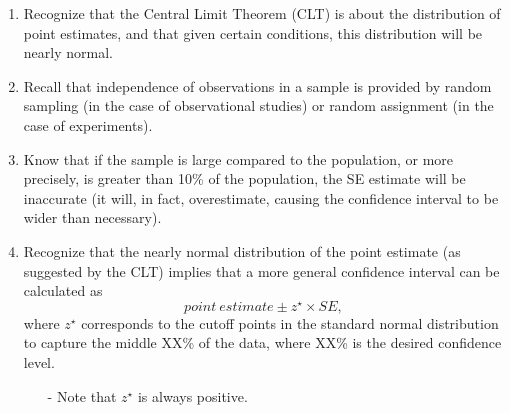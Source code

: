 \documentclass[11pt]{article}
\begin{document}
\begin{enumerate}[resume]
\item Recognize that the Central Limit Theorem (CLT) is about the distribution of point estimates, and that given certain conditions, this distribution will be nearly normal.

\item Recall that independence of observations in a sample is provided by random sampling (in the case of observational studies) or random assignment (in the case of experiments).
\item Know that if the sample is large compared to the population, or more precisely, is greater than 10\% of the population, the SE estimate will be inaccurate (it will, in fact, overestimate, causing the confidence interval to be wider than necessary).\

\item Recognize that the nearly normal distribution of the point estimate (as suggested by the CLT) implies that a more general confidence interval can be calculated as
\[ point~estimate \pm z^{\star} \times SE, \] 
where $z^{\star}$ corresponds to the cutoff points in the standard normal distribution to capture the middle XX\% of the data, where XX\% is the desired confidence level.
\begin{itemize}
\item[-] Note that $z^{\star}$ is always positive.
\end{itemize}


\end{enumerate}
\end{document}
